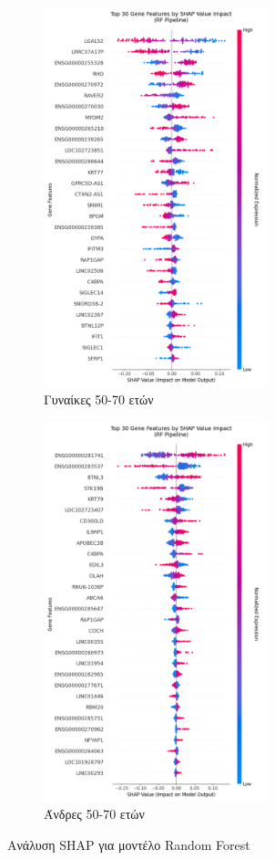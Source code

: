 \documentclass[12pt]{report}
\begin{document}
            \begin{figure}[H]
                \centering
                \begin{subfigure}[b]{0.45\textwidth}
                    \centering
                    \includegraphics[height=11cm,width=\textwidth,keepaspectratio]{ML/Predict/DEG/SHAP/RF/shap_beeswarm_plot_Female_50-70_useSMOTE_False.png}
                    \caption{Γυναίκες 50-70 ετών}
                    \label{fig:shap_beeswarm_RF_plot_Female_50-70_useSMOTE_False}
                \end{subfigure}
                \hfill
                \begin{subfigure}[b]{0.45\textwidth}
                    \centering
                    \includegraphics[height=11cm,width=\textwidth,keepaspectratio]{ML/Predict/DEG/SHAP/RF/shap_beeswarm_plot_Male_50-70_useSMOTE_False.png}
                    \caption{Άνδρες 50-70 ετών}
                    \label{fig:shap_beeswarm_RF_plot_Male_50-70_useSMOTE_False}
                \end{subfigure}
                \caption{Ανάλυση SHAP για μοντέλο Random Forest}
                \label{fig:beeswarm-shap-50-70-rf-classifier}
            \end{figure}             
\end{document}
